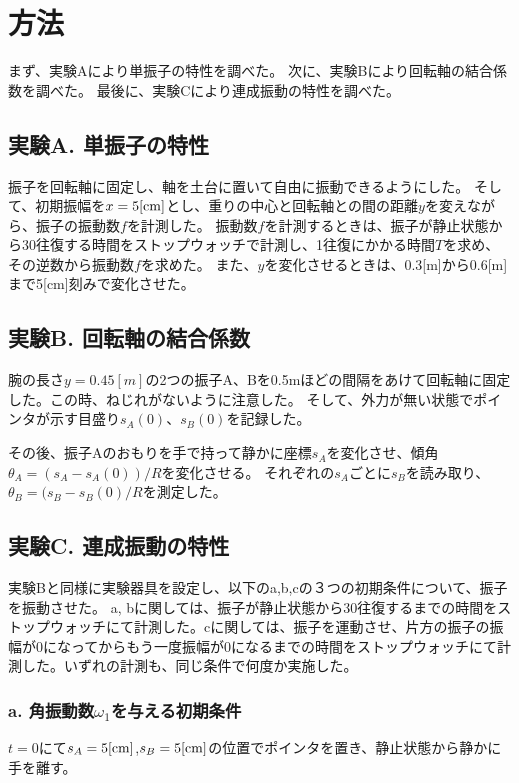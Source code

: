 \documentclass[uplatex,11pt]{jsarticle}
\begin{document}
\section{方法}

まず、実験Aにより単振子の特性を調べた。
次に、実験Bにより回転軸の結合係数を調べた。
最後に、実験Cにより連成振動の特性を調べた。

\subsection*{実験A. 単振子の特性}

振子を回転軸に固定し、軸を土台に置いて自由に振動できるようにした。
そして、初期振幅を$x = 5[{\rm cm}]$とし、重りの中心と回転軸との間の距離$y$を変えながら、振子の振動数$f$を計測した。
振動数$f$を計測するときは、振子が静止状態から30往復する時間をストップウォッチで計測し、1往復にかかる時間$T$を求め、その逆数から振動数$f$を求めた。
また、$y$を変化させるときは、0.3[m]から0.6[m]まで5[cm]刻みで変化させた。

\subsection*{実験B. 回転軸の結合係数}

腕の長さ$y = 0.45[m]$の2つの振子A、Bを0.5mほどの間隔をあけて回転軸に固定した。この時、ねじれがないように注意した。
そして、外力が無い状態でポインタが示す目盛り$s_A(0)$、$s_B(0)$を記録した。

その後、振子Aのおもりを手で持って静かに座標$s_A$を変化させ、傾角$\theta_A = (s_A - s_A(0))/R$を変化させる。
それぞれの$s_A$ごとに$s_B$を読み取り、$\theta_B = (s_B - s_B(0)/R$を測定した。

\subsection*{実験C. 連成振動の特性}

実験Bと同様に実験器具を設定し、以下のa,b,cの３つの初期条件について、振子を振動させた。
a, bに関しては、振子が静止状態から30往復するまでの時間をストップウォッチにて計測した。cに関しては、振子を運動させ、片方の振子の振幅が0になってからもう一度振幅が0になるまでの時間をストップウォッチにて計測した。いずれの計測も、同じ条件で何度か実施した。

\subsubsection*{a. 角振動数$\omega_1$を与える初期条件}
$t=0$にて$s_A = 5[{\rm cm}]$,$s_B = 5[{\rm cm}]$の位置でポインタを置き、静止状態から静かに手を離す。
\end{document}
